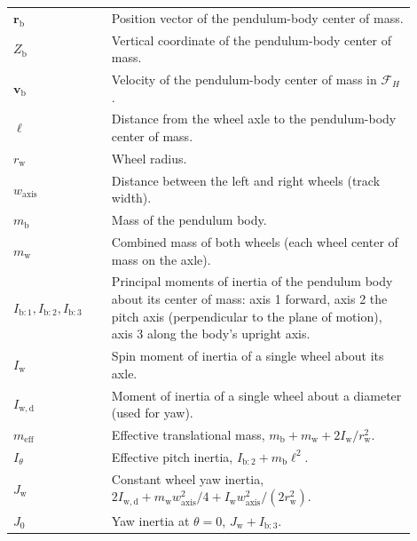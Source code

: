 \documentclass[journal]{IEEEtran}
\begin{document}
\begin{table}[H]
\begin{tabular}{
    >{\raggedright\arraybackslash}p{0.22\linewidth}
    >{\raggedright\arraybackslash}p{0.68\linewidth}
}
$\bm r_{\mathrm b}$
& Position vector of the pendulum-body center of mass. \\

$Z_{\mathrm b}$
& Vertical coordinate of the pendulum-body center of mass. \\

$\bm v_{\mathrm b}$
& Velocity of the pendulum-body center of mass in $\mathcal{F}_H$. \\

$\ell$
& Distance from the wheel axle to the pendulum-body center of mass. \\

$r_{\mathrm w}$
& Wheel radius. \\

$w_{\mathrm{axis}}$
& Distance between the left and right wheels (track width). \\

$m_{\mathrm b}$
& Mass of the pendulum body. \\

$m_{\mathrm w}$
& Combined mass of both wheels (each wheel center of mass on the axle). \\

$I_{\mathrm b:1}, I_{\mathrm b:2}, I_{\mathrm b:3}$
& Principal moments of inertia of the pendulum body about its center of
mass: axis 1 forward, axis 2 the pitch axis (perpendicular to the plane of
motion), axis 3 along the body's upright axis. \\

$I_{\mathrm w}$
& Spin moment of inertia of a single wheel about its axle. \\

$I_{\mathrm{w,d}}$
& Moment of inertia of a single wheel about a diameter (used for yaw). \\

$m_{\mathrm{eff}}$
& Effective translational mass,
$m_{\mathrm b}+m_{\mathrm w}+2I_{\mathrm w}/r_{\mathrm w}^2$. \\

$I_\theta$
& Effective pitch inertia, $I_{\mathrm b:2}+m_{\mathrm b}\ell^2$. \\

$J_{\mathrm w}$
& Constant wheel yaw inertia,
$2I_{\mathrm{w,d}}+m_{\mathrm w}w_{\mathrm{axis}}^2/4+I_{\mathrm w}w_{\mathrm{axis}}^2/(2r_{\mathrm w}^2)$. \\

$J_0$
& Yaw inertia at $\theta=0$, $J_{\mathrm w}+I_{\mathrm b:3}$. \\


\end{tabular}
\end{table}
\end{document}
